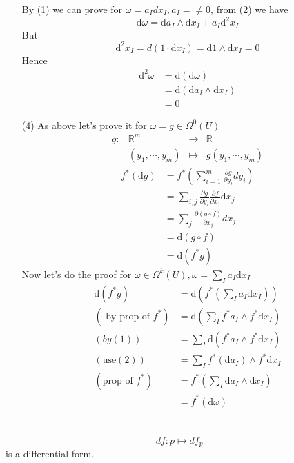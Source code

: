 \documentclass{book}
\begin{document}
\begin{itemize}
        By (1) we can prove for $\omega=a_Idx_I,a_I=\neq0$, from (2) we have
        $$\text{d}\omega=\text{d}a_I\wedge\text{d}x_I+a_I\text{d}^2x_I$$
        But $$\text{d}^2x_I=d(1\cdot\text{d}x_I)=\text{d}1\wedge\text{d}x_I=0$$
        Hence $$\begin{aligned}
        \text{d}^2\omega&=\text{d}(\text{d}\omega)\\ &=\text{d}(\text{d}a_I\wedge\text{d}x_I)\\&=0
        \end{aligned}$$
        \item[(4)]As above let's prove it for $\omega=g\in \Omega^0(U)$
        $$\begin{aligned}
            g:&\mathbb{R}^m&\rightarrow&\mathbb{R}\\ &(y_1,\cdots,y_m)&\mapsto &g(y_1,\cdots,y_m)
            \end{aligned}$$
        $$\begin{aligned}
            f^*(\text{d}g) &=f^*(\sum\limits_{i=1}^m\frac{\partial g}{\partial y_i}dy_i)\\
            &=\sum\limits_{i,j}\frac{\partial g}{\partial y_i}\frac{\partial f}{\partial x_j}\text{d}x_j\\
            &=\sum\limits_j\frac{\partial (g\circ f)}{\partial x_j}dx_j\\
            &=\text{d}(g\circ f)\\
            &=\text{d}(f^*g)
        \end{aligned}$$
        Now let's do the proof for $\omega\in \Omega^k(U), \omega=\sum\limits_{I}a_I\text{d}x_I$
        $$\begin{aligned}
            \text{d}(f^*g) &=\text{d}(f^*(\sum\limits_{I}a_I\text{d}x_I))\\
            (\text{ by prop of } f^*)&=\text{d}(\sum\limits_If^*a_I\wedge f^*\text{d}x_I)\\
            (by (1))&=\sum\limits_I\text{d}(f^*a_I\wedge f^*\text{d}x_I)\\
            (\text{use} (2))&=\sum\limits_If^*(\text{d}a_I)\wedge f^*\text{d}x_I\\
            (\text{prop of }f^*)&=f^*(\sum\limits_I\text{d}a_I\wedge \text{d}x_I)\\
            &=f^*(\text{d}\omega)
        \end{aligned}$$
    \end{itemize}
\section{}
$$df:p\mapsto df_p$$ is a differential form.
\end{document}
